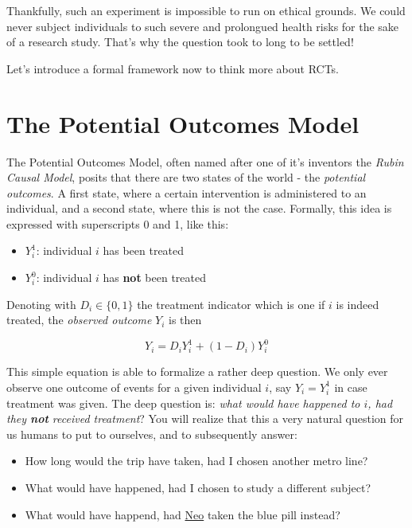 \documentclass[]{book}
\providecommand{\tightlist}{%
  \setlength{\itemsep}{0pt}\setlength{\parskip}{0pt}}
\begin{document}
Thankfully, such an experiment is impossible to run on ethical grounds. We could never subject individuals to such severe and prolongued health risks for the sake of a research study. That's why the question took to long to be settled!

Let's introduce a formal framework now to think more about RCTs.

\hypertarget{rubin}{%
\section{The Potential Outcomes Model}\label{rubin}}

The Potential Outcomes Model, often named after one of it's inventors the \emph{Rubin Causal Model}, posits that there are two states of the world - the \emph{potential outcomes}. A first state, where a certain intervention is administered to an individual, and a second state, where this is not the case. Formally, this idea is expressed with superscripts 0 and 1, like this:

\begin{itemize}
\tightlist
\item
  \(Y_i^1\): individual \(i\) has been treated
\item
  \(Y_i^0\): individual \(i\) has \textbf{not} been treated
\end{itemize}

Denoting with \(D_i \in \{0,1\}\) the treatment indicator which is one if \(i\) is indeed treated, the \emph{observed outcome} \(Y_i\) is then

\begin{equation}
Y_i = D_i Y_i^1 + (1-D_i)Y_i^0 \label{eq:rubin-model}
\end{equation}

This simple equation is able to formalize a rather deep question. We only ever observe one outcome of events for a given individual \(i\), say \(Y_i = Y_i^1\) in case treatment was given. The deep question is: \emph{what would have happened to \(i\), had they \textbf{not} received treatment}? You will realize that this a very natural question for us humans to put to ourselves, and to subsequently answer:

\begin{itemize}
\tightlist
\item
  How long would the trip have taken, had I chosen another metro line?
\item
  What would have happened, had I chosen to study a different subject?
\item
  What would have happend, had \href{https://en.wikipedia.org/wiki/Neo_(The_Matrix)}{Neo} taken the blue pill instead?
\end{itemize}
\end{document}
